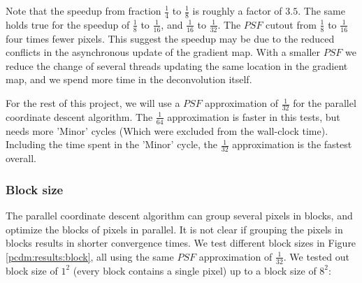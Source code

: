 Note that the speedup from fraction $\frac{1}{4}$ to $\frac{1}{8}$ is roughly a factor of $3.5$. The same holds true for the speedup of $\frac{1}{8}$ to $\frac{1}{16}$, and $\frac{1}{16}$ to $\frac{1}{32}$. The $PSF$ cutout from  $\frac{1}{8}$ to  $\frac{1}{16}$ four times fewer pixels. This suggest the speedup may be due to the reduced conflicts in the asynchronous update of the gradient map. With a smaller $PSF$ we reduce the change of several threads updating the same location in the gradient map, and we spend more time in the deconvolution itself.

For the rest of this project, we will use a $PSF$ approximation of $\frac{1}{32}$ for the parallel coordinate descent algorithm. The $\frac{1}{64}$ approximation is faster in this tests, but needs more 'Minor' cycles (Which were excluded from the wall-clock time). Including the time spent in the 'Minor' cycle, the $\frac{1}{32}$ approximation is the fastest overall.


\subsubsection{Block size}
The parallel coordinate descent algorithm can group several pixels in blocks, and optimize the blocks of pixels in parallel. It is not clear if grouping the pixels in blocks results in shorter convergence times. We test different block sizes in Figure \ref{pcdm:results:block}, all using the same $PSF$ approximation of $\frac{1}{32}$. We tested out block size of $1^2$ (every block contains a single pixel) up to a block size of $8^2$:

